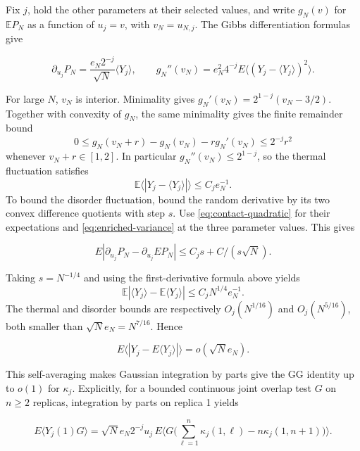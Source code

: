 \documentclass[11pt]{article}
\newcommand{\E}{\mathbb E}
\begin{document}
Fix $j$, hold the other parameters at their selected values, and write $g_N(v)$ for $\E P_N$ as a function of $u_j=v$, with $v_N=u_{N,j}$. The Gibbs differentiation formulas give

\begin{equation*}
\partial_{u_j}P_N=\frac{e_N2^{-j}}{\sqrt N}\langle Y_j\rangle,\qquad
 g_N''(v_N)=e_N^2 4^{-j}E\langle (Y_j-\langle Y_j\rangle)^2\rangle.
\end{equation*}

For large $N$, $v_N$ is interior. Minimality gives
$g_N'(v_N)=2^{1-j}(v_N-3/2)$. Together with convexity of $g_N$, the same minimality gives the finite remainder bound
\begin{equation}\label{eq:contact-quadratic}
 0\le g_N(v_N+r)-g_N(v_N)-r g_N'(v_N)\le2^{-j}r^2
\end{equation}
whenever $v_N+r\in[1,2]$. In particular $g_N''(v_N)\le2^{1-j}$, so the thermal fluctuation satisfies
\[
 \E\langle|Y_j-\langle Y_j\rangle|\rangle\le C_j e_N^{-1}.
\]
To bound the disorder fluctuation, bound the random derivative by its two convex difference quotients with step $s$. Use \eqref{eq:contact-quadratic} for their expectations and \eqref{eq:enriched-variance} at the three parameter values. This gives

\begin{equation*}
E|\partial_{u_j}P_N-\partial_{u_j}E P_N|
     \le C_j s+C/(s\sqrt N).
\end{equation*}

Taking $s=N^{-1/4}$ and using the first-derivative formula above yields
\[
 \E|\langle Y_j\rangle-\E\langle Y_j\rangle|
       \le C_j N^{1/4}e_N^{-1}.
\]
The thermal and disorder bounds are respectively $O_j(N^{1/16})$ and $O_j(N^{5/16})$, both smaller than $\sqrt N e_N=N^{7/16}$. Hence

\begin{equation*}
E\langle |Y_j-E\langle Y_j\rangle|\rangle=o(\sqrt N e_N).
\end{equation*}

This self-averaging makes Gaussian integration by parts give the GG identity up to $o(1)$ for $\kappa_j$. Explicitly, for a bounded continuous joint overlap test $G$ on $n\ge2$ replicas, integration by parts on replica 1 yields

\begin{equation*}
E\langle Y_j(1)G\rangle=
 \sqrt N e_N2^{-j}u_j\,E\Big\langle G\Big(\sum_{\ell=1}^n\kappa_j(1,\ell)
                           -n\kappa_j(1,n+1)\Big)\Big\rangle .
\end{equation*}
\end{document}
